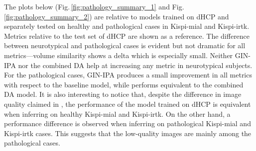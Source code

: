 The plots below (Fig.\,\ref{fig:pathology_summary_1} and Fig.\,\ref{fig:pathology_summary_2}) are relative to models trained on dHCP and separately tested on healthy and pathological cases in Kispi-mial and Kispi-irtk. Metrics relative to the test set of dHCP are shown as a reference. The difference between neurotypical and pathological cases is evident but not dramatic for all metrics---volume similarity shows a delta which is especially small. Neither GIN-IPA nor the combined DA help at increasing any metric in neurotypical subjects. For the pathological cases, GIN-IPA produces a small improvement in all metrics with respect to the baseline model, while performs equivalent to the combined DA model. It is also interesting to notice that, despite the difference in image quality claimed in \cite{FeTA2021_review}, the performance of the model trained on dHCP is equivalent when inferring on healthy Kispi-mial and Kispi-irtk. On the other hand, a performance difference is observed when inferring on pathological Kispi-mial and Kispi-irtk cases. This suggests that the low-quality images are mainly among the pathological cases.

